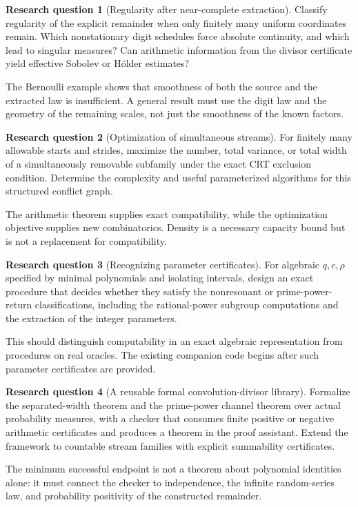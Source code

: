 \documentclass[11pt,letterpaper]{article}
\theoremstyle{definition}
\newtheorem{question}{Research question}
\theoremstyle{remark}
\numberwithin{equation}{section}
\begin{document}
\begin{question}[Regularity after near-complete extraction]
Classify regularity of the explicit remainder when only finitely many uniform coordinates remain. Which nonstationary digit schedules force absolute continuity, and which lead to singular measures? Can arithmetic information from the divisor certificate yield effective Sobolev or H\"older estimates?
\end{question}
The Bernoulli example shows that smoothness of both the source and the extracted law is insufficient. A general result must use the digit law and the geometry of the remaining scales, not just the smoothness of the known factors.

\begin{question}[Optimization of simultaneous streams]
For finitely many allowable starts and strides, maximize the number, total variance, or total width of a simultaneously removable subfamily under the exact CRT exclusion condition. Determine the complexity and useful parameterized algorithms for this structured conflict graph.
\end{question}
The arithmetic theorem supplies exact compatibility, while the optimization objective supplies new combinatorics. Density is a necessary capacity bound but is not a replacement for compatibility.

\begin{question}[Recognizing parameter certificates]
For algebraic $q,c,\rho$ specified by minimal polynomials and isolating intervals, design an exact procedure that decides whether they satisfy the nonresonant or prime-power-return classifications, including the rational-power subgroup computations and the extraction of the integer parameters.
\end{question}
This should distinguish computability in an exact algebraic representation from procedures on real oracles. The existing companion code begins after such parameter certificates are provided.

\begin{question}[A reusable formal convolution-divisor library]
Formalize the separated-width theorem and the prime-power channel theorem over actual probability measures, with a checker that consumes finite positive or negative arithmetic certificates and produces a theorem in the proof assistant. Extend the framework to countable stream families with explicit summability certificates.
\end{question}
The minimum successful endpoint is not a theorem about polynomial identities alone: it must connect the checker to independence, the infinite random-series law, and probability positivity of the constructed remainder.
\end{document}
